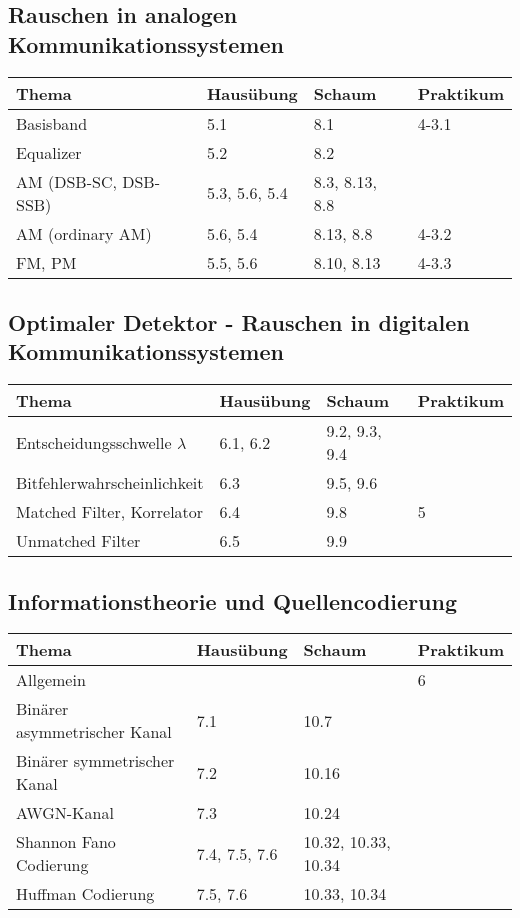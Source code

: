 \subsection{Rauschen in analogen Kommunikationssystemen}
	\begin{tabular}{|p{9cm}|p{2.5cm}|p{3.5cm}|p{2cm}|}
	\hline
	\textbf{Thema} & \textbf{Hausübung} & \textbf{Schaum} & \textbf{Praktikum} \\ 
	\hline
	\hline
	Basisband & 5.1 & 8.1 & 4-3.1\\
	\hline
	Equalizer & 5.2 & 8.2 & \\
	\hline
	AM (DSB-SC, DSB-SSB) & 5.3, 5.6, 5.4 & 8.3, 8.13, 8.8 & \\
	\hline
	AM (ordinary AM) & 5.6, 5.4 & 8.13, 8.8 & 4-3.2\\
	\hline
	FM, PM & 5.5, 5.6 & 8.10, 8.13 & 4-3.3\\
	\hline
	\end{tabular}
\subsection{Optimaler Detektor - Rauschen in digitalen Kommunikationssystemen}
	\begin{tabular}{|p{9cm}|p{2.5cm}|p{3.5cm}|p{2cm}|}
	\hline
	\textbf{Thema} & \textbf{Hausübung} & \textbf{Schaum} & \textbf{Praktikum} \\ 
	\hline
	\hline
	Entscheidungsschwelle $\lambda$ & 6.1, 6.2 & 9.2, 9.3, 9.4 & \\
	\hline
	Bitfehlerwahrscheinlichkeit & 6.3 & 9.5, 9.6 & \\
	\hline
	Matched Filter, Korrelator & 6.4 & 9.8 & 5\\
	\hline
	Unmatched Filter & 6.5 & 9.9 & \\
	\hline
	\end{tabular}
\subsection{Informationstheorie und Quellencodierung}
	\begin{tabular}{|p{9cm}|p{2.5cm}|p{3.5cm}|p{2cm}|}
	\hline
	\textbf{Thema} & \textbf{Hausübung} & \textbf{Schaum} & \textbf{Praktikum} \\ 
	\hline
	\hline
	Allgemein & & & 6\\
	\hline
	Binärer asymmetrischer Kanal & 7.1 & 10.7 & \\
	\hline
	Binärer symmetrischer Kanal & 7.2 & 10.16 & \\
	\hline
	AWGN-Kanal & 7.3 & 10.24 & \\
	\hline
	Shannon Fano Codierung & 7.4, 7.5, 7.6 & 10.32, 10.33, 10.34 & \\
	\hline
	Huffman Codierung & 7.5, 7.6 & 10.33, 10.34 & \\
	\hline
	\end{tabular}
